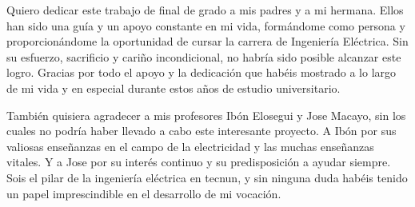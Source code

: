 Quiero dedicar este trabajo de final de grado a mis padres y a mi hermana. Ellos han sido una guía y un apoyo constante en mi vida, formándome como persona y proporcionándome la oportunidad de cursar la carrera de Ingeniería Eléctrica. Sin su esfuerzo, sacrificio y cariño incondicional, no habría sido posible alcanzar este logro. Gracias por todo el apoyo y la dedicación que habéis mostrado a lo largo de mi vida y en especial durante estos años de estudio universitario.

También quisiera agradecer a mis profesores Ibón Elosegui y Jose Macayo, sin los cuales no podría haber llevado a cabo este interesante proyecto. A Ibón por sus valiosas enseñanzas en el campo de la electricidad y las muchas enseñanzas vitales. Y a Jose por su interés continuo y su predisposición a ayudar siempre. Sois el pilar de la ingeniería eléctrica en tecnun, y sin ninguna duda habéis tenido un papel imprescindible en el desarrollo de mi vocación.
